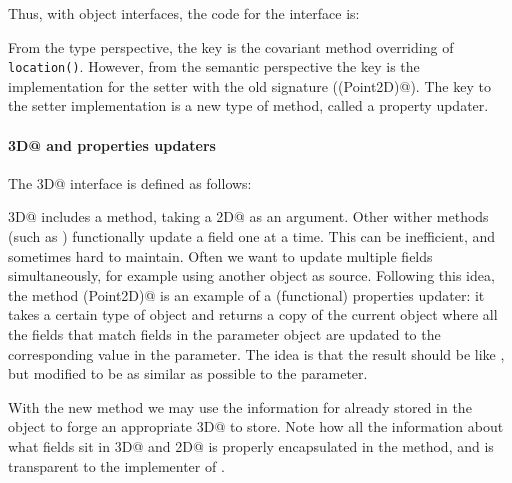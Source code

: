 Thus, with object interfaces, the code for the \Q@Bird@ interface is:




\noindent From the type perspective, the key is the covariant method
overriding of \texttt{location()}. However, from the semantic
perspective the key is the implementation for the setter with the old
signature (\Q@location(Point2D)@). The key to the setter
implementation is a new type of \Q@with@ method, called a property updater.

\paragraph{\Q@Point3D@ and properties updaters}
The \Q@Point3D@ interface is defined as follows:


\noindent \Q@Point3D@ includes a
\Q@with@ method, taking a \Q@Point2D@ as an argument.
Other wither methods (such as \Q@withX@) functionally update a field one at a time.  This can be
inefficient, and sometimes hard to maintain.  Often we want to update multiple
fields simultaneously, for example using another object as source.  Following
this idea, the method \Q@with(Point2D)@ is an example of a (functional)
properties updater: it takes a certain type of object and returns a copy of the
current object where all the fields that match fields in the parameter
object are updated to the corresponding value in the parameter. The idea is that
the result should be like \Q@this@, but modified to be as similar as possible to the parameter.

With the new \Q@with@ method we may use the information for
\Q@z@ already stored in the object to forge an appropriate \Q@Point3D@
to store. Note how all the information about what fields sit in
\Q@Point3D@ and \Q@Point2D@ is properly encapsulated in the
\Q@with@ method, and is transparent to the implementer of \Q@Bird@.

